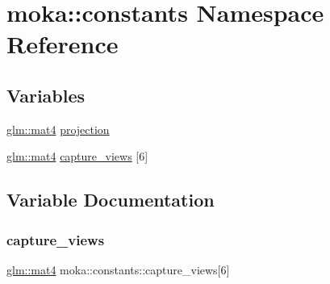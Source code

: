 \hypertarget{namespacemoka_1_1constants}{}\section{moka\+::constants Namespace Reference}
\label{namespacemoka_1_1constants}
\subsection*{Variables}
\begin{DoxyCompactItemize}
\item 
\mbox{\hyperlink{namespacemoka_aed2224bc0e5b79e57a8975ded94ee1aaabe14b41eb96410ea28b32bc138d885ae}{glm\+::mat4}} \mbox{\hyperlink{namespacemoka_1_1constants_a3199ab96065551747c3cb2eb75d1dfa4}{projection}}
\item 
\mbox{\hyperlink{namespacemoka_aed2224bc0e5b79e57a8975ded94ee1aaabe14b41eb96410ea28b32bc138d885ae}{glm\+::mat4}} \mbox{\hyperlink{namespacemoka_1_1constants_a8a8bc9c67ac8a3537cfb1a1dd127c6cf}{capture\+\_\+views}} \mbox{[}6\mbox{]}
\end{DoxyCompactItemize}


\subsection{Variable Documentation}
\mbox{\label{namespacemoka_1_1constants_a8a8bc9c67ac8a3537cfb1a1dd127c6cf}} 
\subsubsection{\texorpdfstring{capture\_views}{capture\_views}}
{\footnotesize\ttfamily \mbox{\hyperlink{namespacemoka_aed2224bc0e5b79e57a8975ded94ee1aaabe14b41eb96410ea28b32bc138d885ae}{glm\+::mat4}} moka\+::constants\+::capture\+\_\+views\mbox{[}6\mbox{]}\hspace{0.3cm}{\ttfamily [inline]}}

